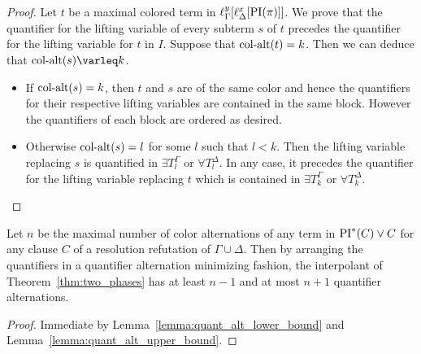 \documentclass[%
	draft=false,%
	numbers=noendperiod,%
	11pt,%
	a4paper,%
	oneside,%
	openany,%
]{memoir}
\begin{document}
\begin{proof}
	Let $t$ be a maximal colored term in $\ell_{\Gamma}^{y}[\ell_{\Delta}^{x}[\operatorname{PI}(\pi)]]$. 
	We prove that the quantifier for the lifting variable of every subterm $s$ of $t$ precedes the quantifier for the lifting variable for $t$ in $I$.
	Suppose that $\operatorname{col-alt}(t) = k$. Then we can deduce that $\ca(s) \varleq\nolinebreak{} k$.
	\begin{itemize}
		\item
			If $\operatorname{col-alt}(s) = k$, then $t$ and $s$ are of the same color and hence the quantifiers for their respective lifting variables are contained in the same block. 
			However the quantifiers of each block are ordered as desired.
		\item
			Otherwise $\operatorname{col-alt}(s) = l$ for some $l$ such that $l < k$.
			Then the lifting variable replacing $s$ is quantified in
			$\exists T_{l}^\Gamma$ or
			$\forall T_{l}^\Delta$.
			In any case, it precedes the quantifier for the lifting variable replacing $t$ which is contained in 
			$\exists T_{k}^\Gamma$ or
			$\forall T_{k}^\Delta$.
			\qedhere
	\end{itemize}
\end{proof}

\begin{thm}
	Let $n$ be the maximal number of color alternations of any term in $\operatorname{PI}^*(C) \lor C$ for any clause $C$ of a resolution refutation of $\Gamma \cup \Delta$.
	Then by arranging the quantifiers in a quantifier alternation minimizing fashion, the interpolant of Theorem~\ref{thm:two_phases} has at least $n-1$ and at most $n+1$ quantifier alternations.
\end{thm}
\begin{proof}
	Immediate by Lemma~\ref{lemma:quant_alt_lower_bound} and Lemma~\ref{lemma:quant_alt_upper_bound}.
\end{proof}


\begin{comment}
\begin{itemize}
	\item Supp $n = 0$. then no quantifiers
	\item Supp $n = 1$.
		then every term has at most one color. 
		Note that there are no subterm-relations between any two terms of different color.
		Hence
		$\forall x_{.} \quantifierdots \forall x_{.}
		\exists y_{.} \quantifierdots \exists y_{.} \lifboth{\PI(\pi)}$ is a minimal arrangement of quantifiers and has either $\ca(I) = 2$ or $\ca(I) = 1$ if there are only terms of one color.

	\item Supp works for $n$.

		not sure..
\end{itemize}


$ \forall x_{t^{\Delta_1}_1} \dots \forall x_{t^{\Delta_1}_{n_{|\Delta_1|}}} $
\end{comment}
\end{document}
